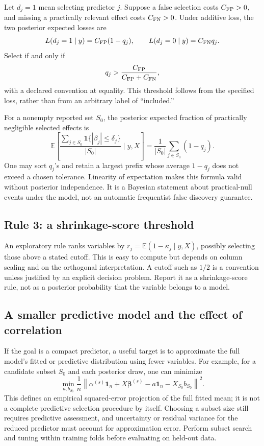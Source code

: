 \documentclass[11pt,letterpaper]{article}
\numberwithin{equation}{section}
\newcommand{\E}{\mathbb{E}}
\newcommand{\ind}{\mathbf{1}}
\newcommand{\given}{\mid}
\newcommand{\bbeta}{\bm{\beta}}
\newcommand{\ones}{\mathbf{1}}
\newcommand{\norm}[1]{\left\lVert#1\right\rVert}
\begin{document}
Let \(d_j=1\) mean selecting predictor \(j\). Suppose a false selection
costs \(C_{\rm FP}>0\), and missing a practically relevant effect costs
\(C_{\rm FN}>0\). Under additive loss, the two posterior expected losses are
\[
 L(d_j=1\given y)=C_{\rm FP}(1-q_j),\qquad
 L(d_j=0\given y)=C_{\rm FN}q_j.
\]
Select if and only if
\begin{equation}\label{eq:selectionloss}
 q_j>\frac{C_{\rm FP}}{C_{\rm FP}+C_{\rm FN}},
\end{equation}
with a declared convention at equality. This threshold follows from the
specified loss, rather than from an arbitrary label of ``included.''

For a nonempty reported set \(S_0\), the posterior expected fraction of
practically negligible selected effects is
\begin{equation}
 \E\left[\frac{\sum_{j\in S_0}\ind\{|\beta_j|\leq\delta_j\}}
                  {|S_0|}\given y,X\right]
 =\frac1{|S_0|}\sum_{j\in S_0}(1-q_j).
\end{equation}
One may sort \(q_j\)'s and retain a largest prefix whose average
\(1-q_j\) does not exceed a chosen tolerance. Linearity of expectation makes
this formula valid without posterior independence. It is a Bayesian statement
about practical-null events under the model, not an automatic frequentist
false discovery guarantee.

\subsection{Rule 3: a shrinkage-score threshold}

An exploratory rule ranks variables by
\(r_j=\E(1-\kappa_j\given y,X)\), possibly selecting those above a stated
cutoff. This is easy to compute but depends on column scaling and on the
orthogonal interpretation. A cutoff such as \(1/2\) is a convention unless
justified by an explicit decision problem. Report it as a shrinkage-score
rule, not as a posterior probability that the variable belongs to a model.

\subsection{A smaller predictive model and the effect of correlation}

If the goal is a compact predictor, a useful target is to approximate the
full model's fitted or predictive distribution using fewer variables. For
example, for a candidate subset \(S_0\) and each posterior draw, one can
minimize
\[
 \min_{a,b_{S_0}}\frac1n
 \norm{\alpha^{(s)}\ones_n+X\bbeta^{(s)}
                -a\ones_n-X_{S_0}b_{S_0}}^2.
\]
This defines an empirical squared-error projection of the full fitted mean;
it is not a complete predictive selection procedure by itself. Choosing a
subset size still requires predictive assessment, and uncertainty or residual
variance for the reduced predictor must account for approximation error.
Perform subset search and tuning within training folds before evaluating on
held-out data.
\end{document}
